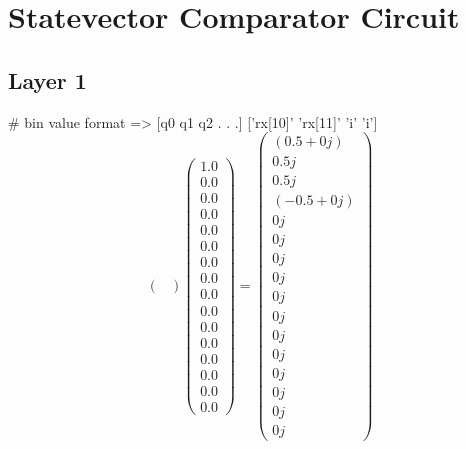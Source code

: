 \documentclass{article}%
\begin{document}
%
\normalsize%
\section{Statevector Comparator Circuit}%
\label{sec:StatevectorComparatorCircuit}%

%
\subsection{Layer 1}%
\label{subsec:Layer1}%
\#  bin value format       => {[}q0 q1 q2 . . .{]}\newline%
%
{[}'rx{[}10{]}' 'rx{[}11{]}' 'i' 'i'{]}%
\[%
\begin{pmatrix}%
%
\end{pmatrix} \begin{pmatrix}%
1.0\\%
0.0\\%
0.0\\%
0.0\\%
0.0\\%
0.0\\%
0.0\\%
0.0\\%
0.0\\%
0.0\\%
0.0\\%
0.0\\%
0.0\\%
0.0\\%
0.0\\%
0.0%
\end{pmatrix} = \begin{pmatrix}%
(0.5+0j)\\%
0.5j\\%
0.5j\\%
(-0.5+0j)\\%
0j\\%
0j\\%
0j\\%
0j\\%
0j\\%
0j\\%
0j\\%
0j\\%
0j\\%
0j\\%
0j\\%
0j%
\end{pmatrix}%
\]

%
\end{document}
